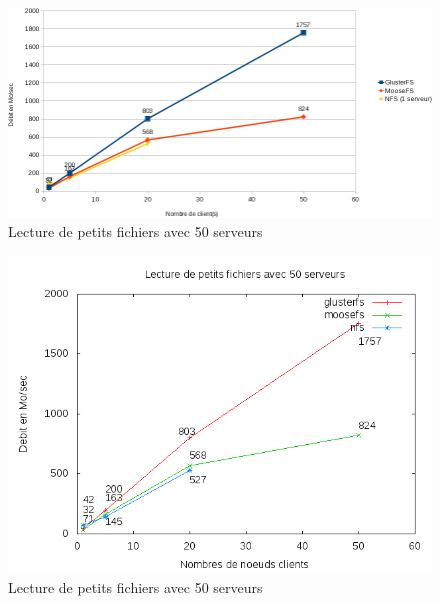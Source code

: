 \documentclass[12pt]{report}
\begin{document}
		        \begin{figure}[H]
			        \begin{center}
				        \includegraphics[width=1\linewidth]{graph/calc/50RS.png}
				        \caption{Lecture de petits fichiers avec 50 serveurs}
			        \end{center}
		        \end{figure}
\begin{figure}[H]
\begin{center}
\includegraphics[bb=0 0 640 480,width=14cm]{images/srv50rs.png}
\caption{Lecture de petits fichiers avec 50 serveurs}
\end{center}
\end{figure} 
\end{document}
